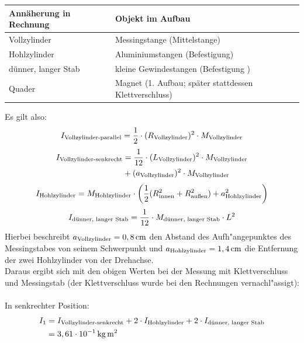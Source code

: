 \documentclass[halfparskip, 11pt]{scrartcl}
\newcommand{\unit}[1]{\ensuremath{\,\mathrm{#1}}} %
\newcommand{\ee}[1]{\ensuremath{\cdot 10^{#1}}}
\newcommand{\ltext}[1]{\ensuremath{_{\textnormal{#1}}}}
\begin{document}
\begin{tabular}[ht]{|l|p{8.5cm}|}
  \hline
  Ann\"aherung in Rechnung & Objekt im Aufbau\\
  \hline\hline
	Vollzylinder & Messingstange (Mittelstange)\\
	Hohlzylinder & Aluminiumstangen (Befestigung)\\
	d\"unner, langer Stab & kleine Gewindestangen (Befestigung%
)\\
	Quader & Magnet (1. Aufbau; sp\"ater stattdessen Klettverschluss)\\
  \hline
\end{tabular}


\noindent
Es gilt also:
\begin{equation}
I\ltext{Vollzylinder-parallel}
=\frac{1}{2} \cdot (R\ltext{Vollzylinder})^2 \cdot M\ltext{Vollzylinder}
\end{equation}
\begin{align}
I\ltext{Vollzylinder-senkrecht}
&= \frac{1}{12} \cdot (L\ltext{Vollzylinder})^2 \cdot M\ltext{Vollzylinder}\nonumber\\
& + (a\ltext{Vollzylinder})^2 \cdot M\ltext{Vollzylinder}
\end{align}
\begin{equation}
I\ltext{Hohlzylinder}
= M\ltext{Hohlzylinder} \cdot 
\left(\frac{1}{2} (R\ltext{innen}^2+R\ltext{außen}^2) + a\ltext{Hohlzylinder}^2\right)
\end{equation}
\begin{equation}
I\ltext{dünner, langer Stab}
=\frac{1}{12} \cdot M\ltext{dünner, langer Stab} \cdot L^2
\end{equation}
Hierbei beschreibt $ a\ltext{Vollzylinder} = 0,8 \unit{cm} $ den Abstand des Aufh"angepunktes des Messingstabes von seinem Schwerpunkt und $ a\ltext{Hohlzylinder} = 1,4 \unit{cm} $ die Entfernung der zwei Hohlzylinder von der Drehachse.\\
Daraus ergibt sich mit den obigen Werten bei der Messung mit Klettverschluss und Messingstab (der Klettverschluss wurde bei den Rechnungen vernachl"assigt):\\
\\
In senkrechter Position:
\begin{align}
I_1
&=
I\ltext{Vollzylinder-senkrecht}+2 \cdot I\ltext{Hohlzylinder} + 2 \cdot I\ltext{dünner, langer Stab}\nonumber\\
&= 3,61 \ee{-1} \unit{kg} \unit{m^2}
\end{align}
\end{document}
